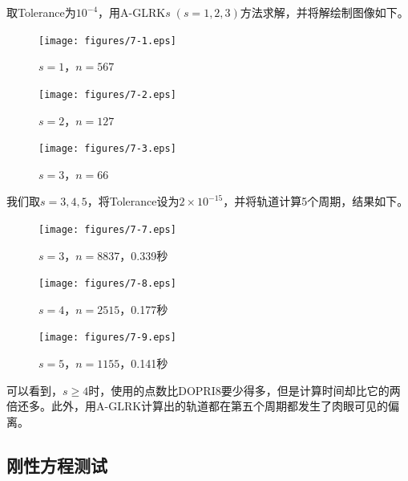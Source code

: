 \documentclass[lang=cn,10pt,bibend=bibtex]{elegantbook}
\begin{document}
取Tolerance为$10^{-4}$，用A-GLRK$s\;(s=1,2,3)$方法求解，并将解绘制图像如下。

\begin{figure}[H]
  \centering
  \begin{minipage}[t]{0.32\linewidth}
      \centering
      \texttt{[image: figures/7-1.eps]}
      \caption*{\small $s=1$，$n=567$}
  \end{minipage}
  \hspace{.31em}
  \begin{minipage}[t]{0.32\linewidth}
      \centering
      \texttt{[image: figures/7-2.eps]}
      \caption*{\small $s=2$，$n=127$}
  \end{minipage}
  \hspace{.31em}
  \begin{minipage}[t]{0.32\linewidth}
      \centering
      \texttt{[image: figures/7-3.eps]}
      \caption*{\small $s=3$，$n=66$}
  \end{minipage}
\end{figure}

我们取$s=3,4,5$，将Tolerance设为$2\times 10^{-15}$，并将轨道计算5个周期，结果如下。

\begin{figure}[H]
  \centering
  \begin{minipage}[t]{0.32\linewidth}
      \centering
      \texttt{[image: figures/7-7.eps]}
      \caption*{\small $s=3$，$n=8837$，0.339秒}
  \end{minipage}
  \hspace{.31em}
  \begin{minipage}[t]{0.32\linewidth}
      \centering
      \texttt{[image: figures/7-8.eps]}
      \caption*{\small $s=4$，$n=2515$，0.177秒}
  \end{minipage}
  \hspace{.31em}
  \begin{minipage}[t]{0.32\linewidth}
      \centering
      \texttt{[image: figures/7-9.eps]}
      \caption*{\small $s=5$，$n=1155$，0.141秒}
  \end{minipage}
\end{figure}

可以看到，$s\geq 4$时，使用的点数比DOPRI8要少得多，但是计算时间却比它的两倍还多。此外，用A-GLRK计算出的轨道都在第五个周期都发生了肉眼可见的偏离。


\subsection{刚性方程测试}
\end{document}
